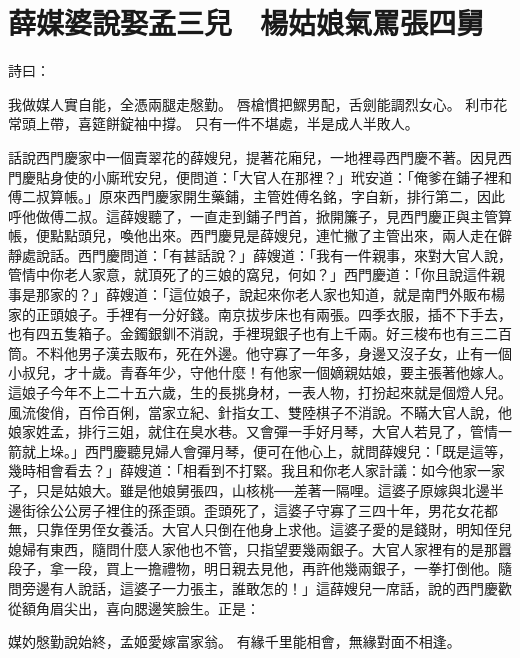 %

\chapter{薛媒婆說娶孟三兒　楊姑娘氣罵張四舅}

\begin{showcontents}{}


詩曰：

我做媒人實自能，全憑兩腿走慇勤。
唇槍慣把鰥男配，舌劍能調烈女心。
利市花常頭上帶，喜筵餅錠袖中撐。
只有一件不堪處，半是成人半敗人。

話說西門慶家中一個賣翠花的薛嫂兒，提著花廂兒，一地裡尋西門慶不著。因見西門慶貼身使的小廝玳安兒，便問道：「大官人在那裡？」玳安道：「俺爹在鋪子裡和傅二叔算帳。」原來西門慶家開生藥鋪，主管姓傅名銘，字自新，排行第二，因此呼他做傅二叔。這薛嫂聽了，一直走到鋪子門首，掀開簾子，見西門慶正與主管算帳，便點點頭兒，喚他出來。西門慶見是薛嫂兒，連忙撇了主管出來，兩人走在僻靜處說話。西門慶問道：「有甚話說？」薛嫂道：「我有一件親事，來對大官人說，管情中你老人家意，就頂死了的三娘的窩兒，何如？」西門慶道：「你且說這件親事是那家的？」薛嫂道：「這位娘子，說起來你老人家也知道，就是南門外販布楊家的正頭娘子。手裡有一分好錢。南京拔步床也有兩張。四季衣服，插不下手去，也有四五隻箱子。金鐲銀釧不消說，手裡現銀子也有上千兩。好三梭布也有三二百筒。不料他男子漢去販布，死在外邊。他守寡了一年多，身邊又沒子女，止有一個小叔兒，才十歲。青春年少，守他什麼！有他家一個嫡親姑娘，要主張著他嫁人。這娘子今年不上二十五六歲，生的長挑身材，一表人物，打扮起來就是個燈人兒。風流俊俏，百伶百俐，當家立紀、針指女工、雙陸棋子不消說。不瞞大官人說，他娘家姓孟，排行三姐，就住在臭水巷。又會彈一手好月琴，大官人若見了，管情一箭就上垛。」西門慶聽見婦人會彈月琴，便可在他心上，就問薛嫂兒：「既是這等，幾時相會看去？」薛嫂道：「相看到不打緊。我且和你老人家計議：如今他家一家子，只是姑娘大。雖是他娘舅張四，山核桃──差著一隔哩。這婆子原嫁與北邊半邊街徐公公房子裡住的孫歪頭。歪頭死了，這婆子守寡了三四十年，男花女花都無，只靠侄男侄女養活。大官人只倒在他身上求他。這婆子愛的是錢財，明知侄兒媳婦有東西，隨問什麼人家他也不管，只指望要幾兩銀子。大官人家裡有的是那囂段子，拿一段，買上一擔禮物，明日親去見他，再許他幾兩銀子，一拳打倒他。隨問旁邊有人說話，這婆子一力張主，誰敢怎的！」這薛嫂兒一席話，說的西門慶歡從額角眉尖出，喜向腮邊笑臉生。正是：

媒妁慇勤說始終，孟姬愛嫁富家翁。
有緣千里能相會，無緣對面不相逢。


\end{showcontents}
